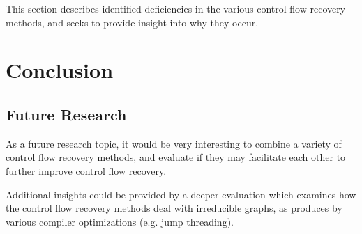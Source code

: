 \documentclass[12pt, a4paper]{article}
\begin{document}
This section describes identified deficiencies in the various control flow recovery methods, and seeks to provide insight into why they occur.

\clearpage


\section{Conclusion}


\subsection{Future Research}

As a future research topic, it would be very interesting to combine a variety of control flow recovery methods, and evaluate if they may facilitate each other to further improve control flow recovery.

Additional insights could be provided by a deeper evaluation which examines how the control flow recovery methods deal with irreducible graphs, as produces by various compiler optimizations (e.g. jump threading).

\clearpage


\end{document}
